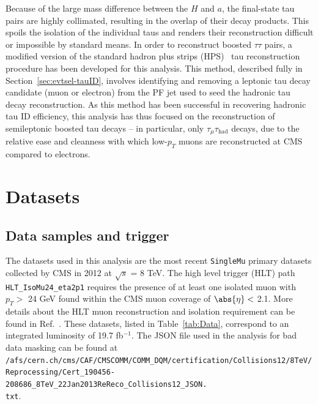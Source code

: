 Because of the large mass difference between the $H$ and $a$, the final-state tau pairs are highly collimated, resulting in the overlap of their decay products. This spoils the isolation of the individual taus and renders their reconstruction difficult or impossible by standard means. In order to reconstruct boosted $\tau\tau$ pairs, a modified version of the standard hadron plus strips (HPS)~\cite{CMS:2011msa} tau reconstruction procedure has been developed for this analysis. This method, described fully in Section~\ref{sec:evtsel-tauID}, involves identifying and removing a leptonic tau decay candidate (muon or electron) from the PF jet used to seed the hadronic tau decay reconstruction. As this method has been successful in recovering hadronic tau ID efficiency, this analysis has thus focused on the reconstruction of semileptonic boosted tau decays -- in particular, only $\tau_{\mu}\tau_{\text{had}}$ decays, due to the relative ease and cleanness with which low-$p_T$ muons are reconstructed at CMS compared to electrons.

\section{Datasets\label{sec:datasets}}

\subsection{Data samples and trigger\label{sec:datasets-data}}
The datasets used in this analysis are the most recent \texttt{SingleMu} primary datasets collected by CMS in 2012 at $\sqrt{s}$ = 8 TeV.  The high level trigger (HLT) path \texttt{HLT\_IsoMu24\_eta2p1} requires the presence of at least one isolated muon with $p_T >$ 24 GeV found within the CMS muon coverage of $\abs{\eta} <$ 2.1.  More details about the HLT muon reconstruction and isolation requirement can be found in Ref.~\cite{HLTMenus}.  These datasets, listed in Table~\ref{tab:Data}, correspond to an integrated luminosity of 19.7 fb$^{-1}$. The JSON file used in the analysis for bad data masking can be found at \texttt{/afs/cern.ch/cms/CAF/CMSCOMM/COMM\_DQM/certification/Collisions12/8TeV/\\Reprocessing/Cert\_190456-208686\_8TeV\_22Jan2013ReReco\_Collisions12\_JSON.\\txt}.

